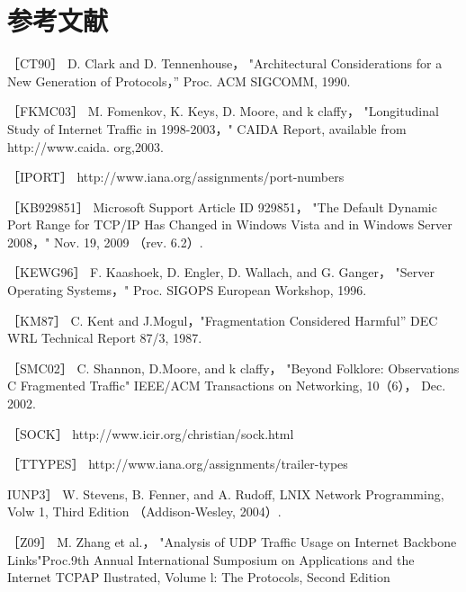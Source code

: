 \section{参考文献}
［CT90］ D. Clark and D. Tennenhouse， "Architectural Considerations for a New
Generation of Protocols，” Proc. ACM SIGCOMM, 1990.

［FKMC03］ M. Fomenkov, K. Keys, D. Moore, and k claffy， "Longitudinal Study of
Internet Traffic in 1998-2003，" CAIDA Report, available from http://www.caida.
org,2003.

［IPORT］ http://www.iana.org/assignments/port-numbers

［KB929851］ Microsoft Support Article ID 929851， "The Default Dynamic Port
Range for TCP/IP Has Changed in Windows Vista and in Windows Server 2008，"
Nov. 19, 2009 （rev. 6.2）.

［KEWG96］ F. Kaashoek, D. Engler, D. Wallach, and G. Ganger， "Server Operating
Systems，" Proc. SIGOPS European Workshop, 1996.

［KM87］ C. Kent and J.Mogul，"Fragmentation Considered Harmful” DEC WRL
Technical Report 87/3, 1987.

［SMC02］ C. Shannon, D.Moore, and k claffy， "Beyond Folklore: Observations C
Fragmented Traffic" IEEE/ACM Transactions on Networking, 10（6）， Dec. 2002.

［SOCK］ http://www.icir.org/christian/sock.html

［TTYPES］ http://www.iana.org/assignments/trailer-types

IUNP3］ W. Stevens, B. Fenner, and A. Rudoff, LNIX Network Programming, Volw
1, Third Edition （Addison-Wesley, 2004）.

［Z09］ M. Zhang et al.， "Analysis of UDP Traffic Usage on Internet Backbone
Links"Proc.9th Annual International Sumposium on Applications and the Internet
TCPAP Ilustrated, Volume l: The Protocols, Second Edition
